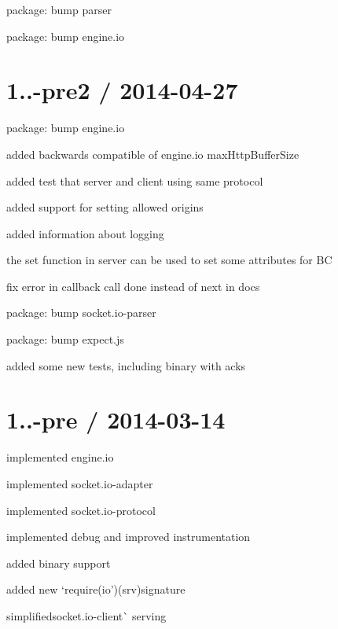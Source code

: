 \begin{DoxyItemize}
\item package\+: bump parser
\item package\+: bump engine.\+io
\end{DoxyItemize}

\section*{1..-\/pre2 / 2014-\/04-\/27 }


\begin{DoxyItemize}
\item package\+: bump {\ttfamily engine.\+io}
\item added backwards compatible of engine.\+io max\+Http\+Buffer\+Size
\item added test that server and client using same protocol
\item added support for setting allowed origins
\item added information about logging
\item the set function in server can be used to set some attributes for BC
\item fix error in callback call \textquotesingle{}done\textquotesingle{} instead of \textquotesingle{}next\textquotesingle{} in docs
\item package\+: bump {\ttfamily socket.\+io-\/parser}
\item package\+: bump {\ttfamily expect.\+js}
\item added some new tests, including binary with acks
\end{DoxyItemize}

\section*{1..-\/pre / 2014-\/03-\/14 }


\begin{DoxyItemize}
\item implemented {\ttfamily engine.\+io}
\item implemented {\ttfamily socket.\+io-\/adapter}
\item implemented {\ttfamily socket.\+io-\/protocol}
\item implemented {\ttfamily debug} and improved instrumentation
\item added binary support
\item added new `require(\textquotesingle{}io')(srv){\ttfamily signature}
\item {\ttfamily simplified}socket.\+io-\/client\`{} serving
\end{DoxyItemize}

